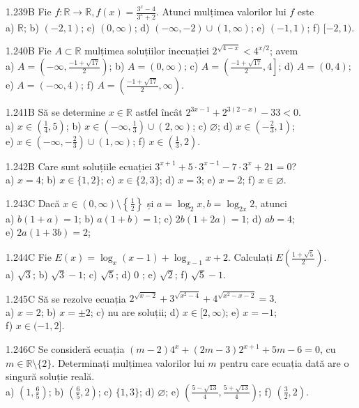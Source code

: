 \documentclass[11pt]{article}
\begin{document}
1.239B Fie $f: \mathbb{R} \rightarrow \mathbb{R}, f(x)=\frac{3^{x}-4}{3^{x}+2}$. Atunci mulțimea valorilor lui $f$ este\\ a) $\mathbb{R}$; b) $(-2,1)$; c) $(0, \infty)$; d) $(-\infty,-2) \cup(1, \infty)$; e) $(-1,1)$; f) $[-2,1)$.

1.240B Fie $A \subset \mathbb{R}$ mulțimea soluțiilor inecuației $2^{\sqrt{4-x}}<4^{x / 2}$; avem\\ a) $A=\left(-\infty, \frac{-1+\sqrt{17}}{2}\right)$; b) $A=(0, \infty)$; c) $A=\left(\frac{-1+\sqrt{17}}{2}, 4\right]$; d) $A=(0,4)$; e) $A=(-\infty, 4)$; f) $A=\left(\frac{-1+\sqrt{17}}{2}, \infty\right)$.

1.241B Să se determine $x \in \mathbb{R}$ astfel încât $2^{3 x-1}+2^{3(2-x)}-33<0$.\\ a) $x \in\left(\frac{1}{4}, 5\right)$; b) $x \in\left(-\infty, \frac{1}{3}\right) \cup(2, \infty)$; c) $\varnothing$; d) $x \in\left(-\frac{2}{3}, 1\right)$;\\ e) $x \in\left(-\infty,-\frac{2}{3}\right) \cup(1, \infty)$; f) $x \in\left(\frac{1}{3}, 2\right)$.

1.242B Care sunt soluțiile ecuației $3^{x+1}+5 \cdot 3^{x-1}-7 \cdot 3^{x}+21=0$?\\ a) $x=4$; b) $x \in\{1,2\}$; c) $x \in\{2,3\}$; d) $x=3$; e) $x=2$; f) $x \in \varnothing$.

1.243C Dacă $x \in(0, \infty) \setminus\left\{\frac{1}{2}\right\}$ și $a=\log _{2} x, b=\log _{2 x} 2$, atunci\\ a) $b(1+a)=1$; b) $a(1+b)=1$; c) $2 b(1+2 a)=1$; d) $a b=4$;\\ e) $2 a(1+3 b)=2$;

1.244C Fie $E(x)=\log _{x}(x-1)+\log _{x-1} x+2$. Calculați $E\left(\frac{1+\sqrt{5}}{2}\right)$.\\ a) $\sqrt{3}$; b) $\sqrt{3}-1$; c) $\sqrt{5}$; d) 0 ; e) $\sqrt{2}$; f) $\sqrt{5}-1$.

1.245C Să se rezolve ecuația $2^{\sqrt{x-2}}+3^{\sqrt{x^{2}-4}}+4^{\sqrt{x^{2}-x-2}}=3$.\\ a) $x=2$; b) $x= \pm 2$; c) nu are soluții; d) $x \in[2, \infty)$; e) $x=-1$;\\ f) $x \in(-1,2]$.

1.246C Se consideră ecuația $(m-2) 4^{x}+(2 m-3) 2^{x+1}+5 m-6=0$, cu $m \in \mathbb{R} \setminus\{2\}$. Determinați mulțimea valorilor lui $m$ pentru care ecuația dată are o singură soluție reală.\\ a) $\left(1, \frac{6}{5}\right)$; b) $\left(\frac{6}{5}, 2\right)$; c) $\{1,3\}$; d) $\varnothing$; e) $\left(\frac{5-\sqrt{13}}{4}, \frac{5+\sqrt{13}}{4}\right)$; f) $\left(\frac{3}{2}, 2\right)$.
\end{document}
